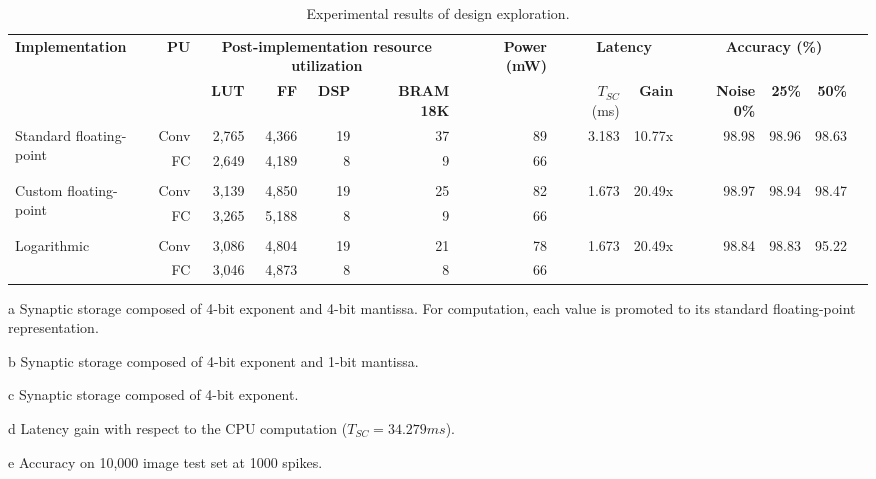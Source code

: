 \begin{table}[!t]
	\begin{threeparttable}
		\centering
		\caption{Experimental results of design exploration.}\label{tab:results}
		\scriptsize
		\begin{tabular}{lrrrrrrrrrrrrrrr}\toprule
			\multirow{2}{*}{\textbf{Implementation}} &\multirow{2}{*}{\textbf{PU}} &\multicolumn{4}{c}{\textbf{Post-implementation resource utilization}} & &\multirow{2}{*}{\textbf{Power (mW)}} & &\multicolumn{2}{c}{\textbf{Latency}} & &\multicolumn{3}{c}{\textbf{Accuracy (\%)\tnote{e}}} \\\cmidrule{3-6}\cmidrule{10-11}\cmidrule{13-15}
			& &\textbf{LUT} &\textbf{FF} &\textbf{DSP} &\textbf{BRAM 18K} & & & &$T_{SC}$ (ms) &\textbf{Gain\tnote{d}} & &\textbf{Noise 0\%} &\textbf{25\%} &\textbf{50\%} \\\midrule
			\multirow{2}{*}{Standard floating-point\tnote{a}} &Conv &2,765 &4,366 &19 &37 & &89 & &\multirow{2}{*}{3.183} &\multirow{2}{*}{10.77x} & &\multirow{2}{*}{98.98} &\multirow{2}{*}{98.96} &\multirow{2}{*}{98.63} \\
			&FC &2,649 &4,189 &8 &9 & &66 & & & & & & & \\
			& & & & & & & & & & & & & & \\
			\multirow{2}{*}{Custom floating-point\tnote{b}} &Conv &3,139 &4,850 &19 &25 & &82 & &\multirow{2}{*}{1.673} &\multirow{2}{*}{20.49x} & &\multirow{2}{*}{98.97} &\multirow{2}{*}{98.94} &\multirow{2}{*}{98.47} \\
			&FC &3,265 &5,188 &8 &9 & &66 & & & & & & & \\
			& & & & & & & & & & & & & & \\
			\multirow{2}{*}{Logarithmic\tnote{c}} &Conv &3,086 &4,804 &19 &21 & &78 & &\multirow{2}{*}{1.673} &\multirow{2}{*}{20.49x} & &\multirow{2}{*}{98.84} &\multirow{2}{*}{98.83} &\multirow{2}{*}{95.22} \\
			&FC &3,046 &4,873 &8 &8 & &66 & & & & & & & \\
			\bottomrule
		\end{tabular}
		\begin{tablenotes}
			\scriptsize
			\item[a] Synaptic storage composed of 4-bit exponent and 4-bit mantissa. For computation, each value is promoted to its standard floating-point representation.
			\item[b] Synaptic storage composed of 4-bit exponent and 1-bit mantissa.
			\item[c] Synaptic storage composed of 4-bit exponent.
			\item[d] Latency gain with respect to the CPU computation ($T_{SC} = 34.279 ms$).
			\item[e] Accuracy on 10,000 image test set at 1000 spikes.
		\end{tablenotes}
	\end{threeparttable}
\end{table}